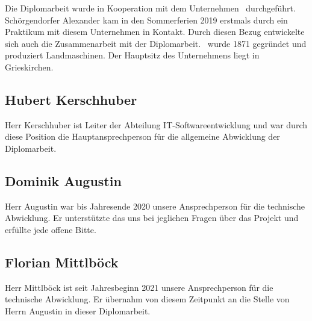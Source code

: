 Die Diplomarbeit wurde in Kooperation mit dem Unternehmen \ThPartnerName \, durchgeführt. Schörgendorfer Alexander kam in den Sommerferien 2019 erstmals durch ein Praktikum mit diesem Unternehmen in Kontakt. Durch diesen Bezug entwickelte sich auch die Zusammenarbeit mit der Diplomarbeit. \ThPartnerName \, wurde 1871 gegründet und produziert Landmaschinen. Der Hauptsitz des Unternehmens liegt in Grieskirchen.

\subsection{Hubert Kerschhuber}

Herr Kerschhuber ist Leiter der Abteilung IT-Softwareentwicklung und war durch diese Position die Hauptansprechperson für die allgemeine Abwicklung der Diplomarbeit.

\subsection{Dominik Augustin}

Herr Augustin war bis Jahresende 2020 unsere Ansprechperson für die technische Abwicklung. Er unterstützte das uns bei jeglichen Fragen über das Projekt und erfüllte jede offene Bitte.

\subsection{Florian Mittlböck}

Herr Mittlböck ist seit Jahresbeginn 2021 unsere Ansprechperson für die technische Abwicklung. Er übernahm von diesem Zeitpunkt an die Stelle von Herrn Augustin in dieser Diplomarbeit.
